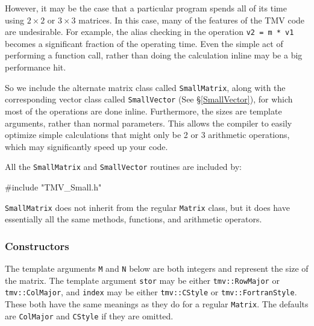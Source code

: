 \documentclass[twoside,letterpaper,11pt]{article}
\renewcommand{\tt}[1]{{\lstinline {#1}}}
\begin{document}
However, it may be the case that a particular program spends all of its
time using $2 \times 2$ or $3 \times 3$ matrices.  In this case, 
many of the features of the TMV code are undesirable.  For example, 
the alias checking in the operation \tt{v2 = m * v1} becomes a significant
fraction of the operating time.  Even the simple act of performing a function
call, rather than doing the calculation inline may be a big performance hit.

So we include the alternate matrix class called \tt{SmallMatrix}, along 
with the corresponding vector class called \tt{SmallVector} (See \S\ref{SmallVector}), 
for which most of 
the operations are done inline.  Furthermore, the sizes are template arguments,
rather than normal parameters.  This allows the compiler to easily optimize
simple calculations that might only be 2 or 3 arithmetic operations, which
may significantly speed up your code.

All the \tt{SmallMatrix} and \tt{SmallVector} routines are included by:
\begin{tmvcode}
#include "TMV_Small.h"
\end{tmvcode}

\tt{SmallMatrix} does not inherit from the regular \tt{Matrix} class, 
but it does have 
essentially all the same methods, functions, and arithmetic operators. 

\subsubsection{Constructors}
\label{SmallMatrix_Constructors}

The template arguments \tt{M} and \tt{N} below are both integers and
represent the size of the matrix.
The template argument \tt{stor} may be either \tt{tmv::RowMajor} or
\tt{tmv::ColMajor}, and
 \tt{index} may be either \tt{tmv::CStyle} or
\tt{tmv::FortranStyle}.  These both have the same meanings as they do 
for a regular \tt{Matrix}. The defaults are \tt{ColMajor} and \tt{CStyle} if they
are omitted.
\end{document}
